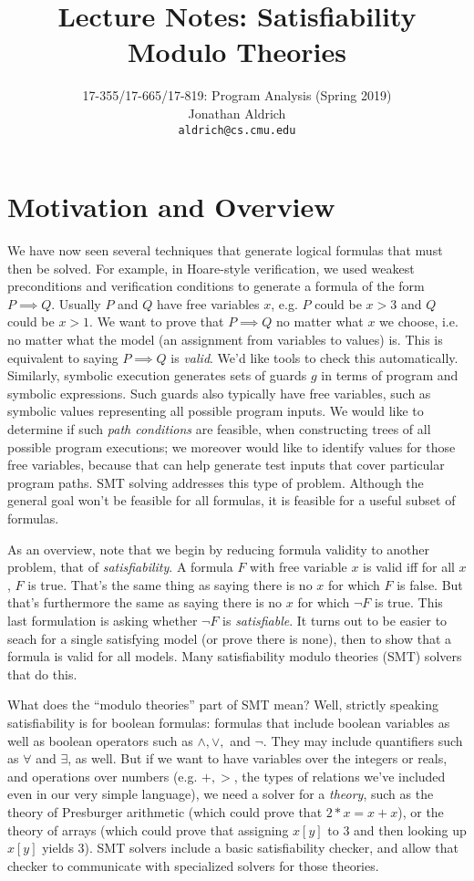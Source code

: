 \documentclass[11pt]{article}
\title{Lecture Notes: Satisfiability Modulo Theories}
\author{17-355/17-665/17-819: Program Analysis (Spring 2019)\\
        Jonathan Aldrich\\
		{\tt aldrich@cs.cmu.edu}}
\date{}
\begin{document}
\maketitle


\section{Motivation and Overview}

We have now seen several techniques that generate logical formulas that must
then be solved. For example, in Hoare-style verification, we used weakest
preconditions and verification conditions to generate a formula of the form
$P \implies Q$. Usually $P$ and $Q$ have free variables $x$, e.g. $P$ could be
$x > 3$ and $Q$ could be $x > 1$. We want to prove that $P \implies Q$ no matter
what $x$ we choose, i.e. no matter what the model (an assignment from variables
to values) is. This is equivalent to saying $P \implies Q$ is \textit{valid}.
We'd like tools to check this automatically. Similarly, symbolic execution
generates sets of guards $g$ in terms of program and symbolic expressions. Such
guards also typically have free variables, such as symbolic values representing
all possible program inputs. We would like to determine if such \emph{path
  conditions} are feasible, when constructing trees of all possible program
executions; we moreover would like to identify values for those free variables,
because that can help generate test inputs that cover particular program paths.
SMT solving addresses this type of problem. Although the general goal won't be
feasible for all formulas, it is feasible for a useful subset of formulas.

As an overview, note that we begin by reducing formula validity to another
problem, that of \textit{satisfiability}. A formula $F$ with free variable $x$
is valid iff for all $x$, $F$ is true. That's the same thing as saying there is
no $x$ for which $F$ is false. But that's furthermore the same as saying there
is no $x$ for which $\lnot F$ is true. This last formulation is asking whether
$\lnot F$ is \textit{satisfiable}. It turns out to be easier to seach for a
single satisfying model (or prove there is none), then to show that a formula is
valid for all models. Many satisfiability modulo theories (SMT) solvers that do
this.

What does the ``modulo theories'' part of SMT mean? Well, strictly speaking
satisfiability is for boolean formulas: formulas that include boolean variables
as well as boolean operators such as $\land, \lor,$ and $\lnot$. They may
include quantifiers such as $\forall$ and $\exists$, as well. But if we want to
have variables over the integers or reals, and operations over numbers (e.g.
$+,>$, the types of relations we've included even in our very simple \WhileLang
language), we need a solver for a \textit{theory}, such as the theory of
Presburger arithmetic (which could prove that $2*x = x+x$), or the theory of
arrays (which could prove that assigning $x[y]$ to $3$ and then looking up
$x[y]$ yields $3$). SMT solvers include a basic satisfiability checker, and
allow that checker to communicate with specialized solvers for those theories.
\end{document}
